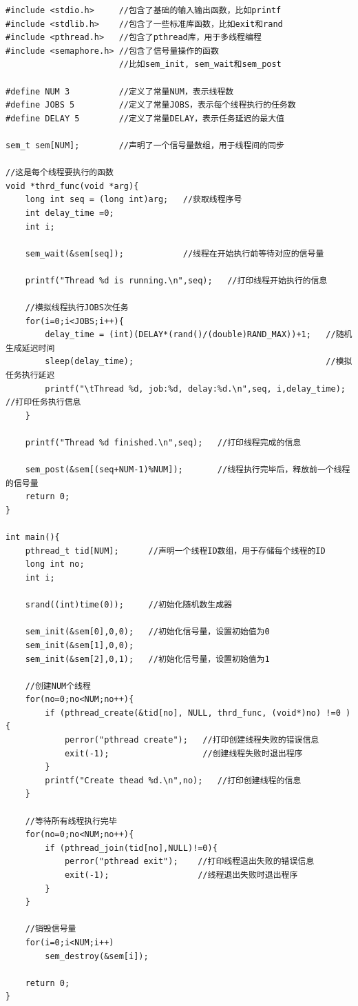 \documentclass[12pt, a4paper, oneside]{ctexbook}
\numberwithin{figure}{section}
\begin{document}
\begin{verbatim}
#include <stdio.h>     //包含了基础的输入输出函数，比如printf
#include <stdlib.h>    //包含了一些标准库函数，比如exit和rand
#include <pthread.h>   //包含了pthread库，用于多线程编程
#include <semaphore.h> //包含了信号量操作的函数
                       //比如sem_init, sem_wait和sem_post

#define NUM 3          //定义了常量NUM，表示线程数
#define JOBS 5         //定义了常量JOBS，表示每个线程执行的任务数
#define DELAY 5        //定义了常量DELAY，表示任务延迟的最大值

sem_t sem[NUM];        //声明了一个信号量数组，用于线程间的同步

//这是每个线程要执行的函数
void *thrd_func(void *arg){
    long int seq = (long int)arg;   //获取线程序号
    int delay_time =0;
    int i;

    sem_wait(&sem[seq]);            //线程在开始执行前等待对应的信号量

    printf("Thread %d is running.\n",seq);   //打印线程开始执行的信息   
    
    //模拟线程执行JOBS次任务
    for(i=0;i<JOBS;i++){
        delay_time = (int)(DELAY*(rand()/(double)RAND_MAX))+1;   //随机生成延迟时间
        sleep(delay_time);                                       //模拟任务执行延迟
        printf("\tThread %d, job:%d, delay:%d.\n",seq, i,delay_time);   //打印任务执行信息
    }

    printf("Thread %d finished.\n",seq);   //打印线程完成的信息
    
    sem_post(&sem[(seq+NUM-1)%NUM]);       //线程执行完毕后，释放前一个线程的信号量
    return 0;
}

int main(){
    pthread_t tid[NUM];      //声明一个线程ID数组，用于存储每个线程的ID
    long int no;
    int i;

    srand((int)time(0));     //初始化随机数生成器

    sem_init(&sem[0],0,0);   //初始化信号量，设置初始值为0
    sem_init(&sem[1],0,0);   
    sem_init(&sem[2],0,1);   //初始化信号量，设置初始值为1

    //创建NUM个线程
    for(no=0;no<NUM;no++){    
        if (pthread_create(&tid[no], NULL, thrd_func, (void*)no) !=0 ){   
            perror("pthread create");   //打印创建线程失败的错误信息
            exit(-1);                   //创建线程失败时退出程序
        }
        printf("Create thead %d.\n",no);   //打印创建线程的信息
    }

    //等待所有线程执行完毕
    for(no=0;no<NUM;no++){    
        if (pthread_join(tid[no],NULL)!=0){
            perror("pthread exit");    //打印线程退出失败的错误信息
            exit(-1);                  //线程退出失败时退出程序
        }
    }
    
    //销毁信号量
    for(i=0;i<NUM;i++)
        sem_destroy(&sem[i]);   

    return 0;
}

\end{verbatim}
\end{document}
